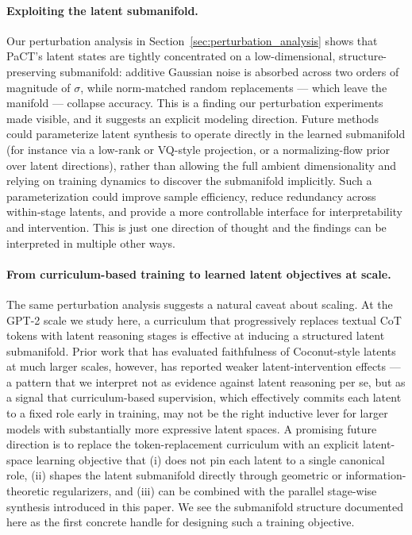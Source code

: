 \documentclass{article}
\theoremstyle{plain}
\theoremstyle{definition}
\theoremstyle{remark}
\begin{document}
\paragraph{Exploiting the latent submanifold.}
Our perturbation analysis in Section~\ref{sec:perturbation_analysis} shows that PaCT's latent states are tightly concentrated on a low-dimensional, structure-preserving submanifold: additive Gaussian noise is absorbed across two orders of magnitude of $\sigma$, while norm-matched random replacements — which leave the manifold — collapse accuracy. This is a finding our perturbation experiments made visible, and it suggests an explicit modeling direction. Future methods could parameterize latent synthesis to operate directly in the learned submanifold (for instance via a low-rank or VQ-style projection, or a normalizing-flow prior over latent directions), rather than allowing the full ambient dimensionality and relying on training dynamics to discover the submanifold implicitly. Such a parameterization could improve sample efficiency, reduce redundancy across within-stage latents, and provide a more controllable interface for interpretability and intervention. This is just one direction of thought and the findings can be interpreted in multiple other ways.

\paragraph{From curriculum-based training to learned latent objectives at scale.}
The same perturbation analysis suggests a natural caveat about scaling. At the GPT-2 scale we study here, a curriculum that progressively replaces textual CoT tokens with latent reasoning stages is effective at inducing a structured latent submanifold. Prior work that has evaluated faithfulness of Coconut-style latents at much larger scales, however, has reported weaker latent-intervention effects — a pattern that we interpret not as evidence against latent reasoning per se, but as a signal that curriculum-based supervision, which effectively commits each latent to a fixed role early in training, may not be the right inductive lever for larger models with substantially more expressive latent spaces. A promising future direction is to replace the token-replacement curriculum with an explicit latent-space learning objective that (i) does not pin each latent to a single canonical role, (ii) shapes the latent submanifold directly through geometric or information-theoretic regularizers, and (iii) can be combined with the parallel stage-wise synthesis introduced in this paper. We see the submanifold structure documented here as the first concrete handle for designing such a training objective.
\end{document}
